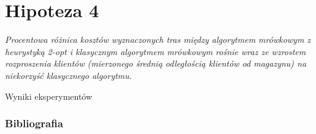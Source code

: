 \documentclass{beamer}
\begin{document}
\section*{Hipoteza 4}

\begin{frame}
    \textit{Procentowa różnica kosztów wyznaczonych tras między algorytmem mrówkowym z heurystyką 2-opt i klasycznym algorytmem mrówkowym rośnie wraz ze wzrostem rozproszenia klientów (mierzonego średnią odległością klientów od magazynu) na niekorzyść klasycznego algorytmu.}
\end{frame}


\begin{frame}{Wyniki eksperymentów}

\end{frame}


\begin{frame}[allowframebreaks]
    \frametitle{Bibliografia}
    \nocite{*}
    
    
\end{frame}
\end{document}
